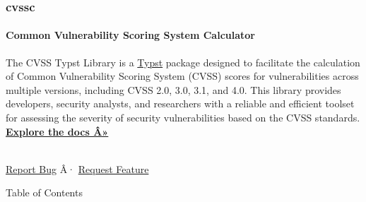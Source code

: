 \hfill\break

\subsubsection{cvssc}\label{cvssc-1}

\paragraph{Common Vulnerability Scoring System
Calculator}\label{common-vulnerability-scoring-system-calculator}

The CVSS Typst Library is a \href{https://github.com/typst/}{Typst}
package designed to facilitate the calculation of Common Vulnerability
Scoring System (CVSS) scores for vulnerabilities across multiple
versions, including CVSS 2.0, 3.0, 3.1, and 4.0. This library provides
developers, security analysts, and researchers with a reliable and
efficient toolset for assessing the severity of security vulnerabilities
based on the CVSS standards.\\
\href{https://github.com/DrakeAxelrod/cvssc/tree/main/cvssc/0.1.0/src/docs.pdf}{\textbf{Explore
the docs Â»}}\\
\strut \\
\href{https://github.com/DrakeAxelrod/cvssc/issues}{Report Bug} Â·
\href{https://github.com/DrakeAxelrod/cvssc/issues}{Request Feature}

Table of Contents

